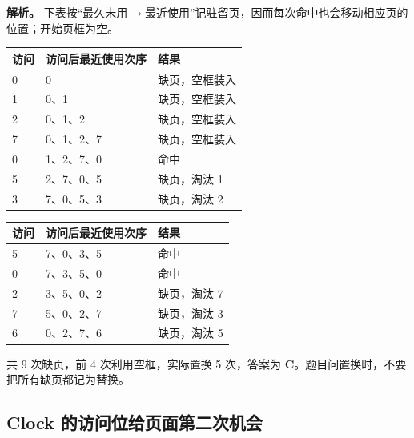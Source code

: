 \textbf{解析。} 下表按“最久未用\ensuremath{\to}最近使用”记驻留页，因而每次命中也会移动相应页的位置；开始页框为空。

\begin{wideblock}

\par\medskip\noindent\begin{minipage}{\linewidth}\fontsize{9.3}{12}\selectfont\begin{tabularx}{\linewidth}{@{}YYY@{}}
\toprule\noalign{}
访问 & 访问后最近使用次序 & 结果 \\
\midrule\noalign{}


0 & 0 & 缺页，空框装入 \\
1 & 0、1 & 缺页，空框装入 \\
2 & 0、1、2 & 缺页，空框装入 \\
7 & 0、1、2、7 & 缺页，空框装入 \\
0 & 1、2、7、0 & 命中 \\
5 & 2、7、0、5 & 缺页，淘汰 1 \\
3 & 7、0、5、3 & 缺页，淘汰 2 \\
\bottomrule\end{tabularx}
\end{minipage}\par\medskip

\par\medskip\noindent\begin{minipage}{\linewidth}\fontsize{9.3}{12}\selectfont\begin{tabularx}{\linewidth}{@{}YYY@{}}
\toprule\noalign{}
访问 & 访问后最近使用次序 & 结果 \\
\midrule\noalign{}


5 & 7、0、3、5 & 命中 \\
0 & 7、3、5、0 & 命中 \\
2 & 3、5、0、2 & 缺页，淘汰 7 \\
7 & 5、0、2、7 & 缺页，淘汰 3 \\
6 & 0、2、7、6 & 缺页，淘汰 5 \\
\bottomrule\end{tabularx}
\end{minipage}\par\medskip

\end{wideblock}

共 9 次缺页，前 4 次利用空框，实际置换 5 次，答案为 \textbf{C}。题目问置换时，不要把所有缺页都记为替换。

\subsection{Clock 的访问位给页面第二次机会}\label{OS03-auto-3}

